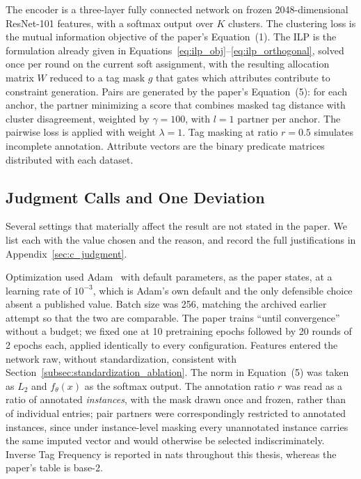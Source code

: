 The encoder is a three-layer fully connected network on frozen 2048-dimensional ResNet-101 features, with a softmax output over $K$ clusters. The clustering loss is the mutual information objective of the paper's Equation~(1). The ILP is the formulation already given in Equations~\ref{eq:ilp_obj}--\ref{eq:ilp_orthogonal}, solved once per round on the current soft assignment, with the resulting allocation matrix $W$ reduced to a tag mask $g$ that gates which attributes contribute to constraint generation. Pairs are generated by the paper's Equation~(5): for each anchor, the partner minimizing a score that combines masked tag distance with cluster disagreement, weighted by $\gamma = 100$, with $l = 1$ partner per anchor. The pairwise loss is applied with weight $\lambda = 1$. Tag masking at ratio $r = 0.5$ simulates incomplete annotation. Attribute vectors are the binary predicate matrices distributed with each dataset.

\subsection{Judgment Calls and One Deviation}
\label{subsec:repro_judgment}

Several settings that materially affect the result are not stated in the paper. We list each with the value chosen and the reason, and record the full justifications in Appendix~\ref{sec:c_judgment}.

Optimization used Adam~\citep{KingmaBa2015} with default parameters, as the paper states, at a learning rate of $10^{-3}$, which is Adam's own default and the only defensible choice absent a published value. Batch size was 256, matching the archived earlier attempt so that the two are comparable. The paper trains ``until convergence'' without a budget; we fixed one at 10 pretraining epochs followed by 20 rounds of 2 epochs each, applied identically to every configuration. Features entered the network raw, without standardization, consistent with Section~\ref{subsec:standardization_ablation}. The norm in Equation~(5) was taken as $L_2$ and $f_\theta(x)$ as the softmax output. The annotation ratio $r$ was read as a ratio of annotated \emph{instances}, with the mask drawn once and frozen, rather than of individual entries; pair partners were correspondingly restricted to annotated instances, since under instance-level masking every unannotated instance carries the same imputed vector and would otherwise be selected indiscriminately. Inverse Tag Frequency is reported in nats throughout this thesis, whereas the paper's table is base-2.

